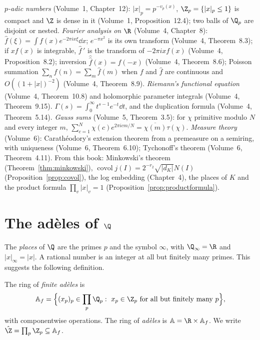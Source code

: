 \begin{reminder}
\emph{$p$-adic numbers} (Volume~1, Chapter~12): $|x|_p=p^{-v_p(x)}$, $\Z_p=\{|x|_p\le1\}$ is compact and $\Z$ is dense in it
(Volume~1, Proposition~12.4); two balls of $\Q_p$ are disjoint or nested. \emph{Fourier analysis on $\R$} (Volume~4, Chapter~8):
$\hat f(\xi)=\int f(x)e^{-2\pi ix\xi}\dd x$; $e^{-\pi x^2}$ is its own transform (Volume~4, Theorem~8.3); if $xf(x)$ is integrable,
$\hat f\,'$ is the transform of $-2\pi ixf(x)$ (Volume~4, Proposition~8.2); inversion $\hat{\hat f}(x)=f(-x)$ (Volume~4, Theorem~8.6);
Poisson summation $\sum_nf(n)=\sum_m\hat f(m)$ when $f$ and $\hat f$ are continuous and $O((1+|x|)^{-2})$ (Volume~4, Theorem~8.9).
\emph{Riemann's functional equation} (Volume~4, Theorem~10.8) and holomorphic parameter integrals (Volume~4, Theorem~9.15).
$\Gamma(s)=\int_0^\infty t^{s-1}e^{-t}\dd t$, and the duplication formula (Volume~4, Theorem~5.14). \emph{Gauss sums} (Volume~5,
Theorem~3.5): for $\chi$ primitive modulo $N$ and every integer $m$, $\sum_{c=1}^N\chi(c)e^{2\pi icm/N}=\overline{\chi(m)}\tau(\chi)$.
\emph{Measure theory} (Volume~6): Carath\'eodory's extension theorem from a premeasure on a semiring, with uniqueness (Volume~6,
Theorem~6.10); Tychonoff's theorem (Volume~6, Theorem~4.11). From this book: Minkowski's theorem (Theorem~\ref{thm:minkowski}),
$\operatorname{covol}j(I)=2^{-r_2}\sqrt{|d_K|}N(I)$ (Proposition~\ref{prop:covol}), the log embedding (Chapter~4), the places of $K$
and the product formula $\prod_v|x|_v=1$ (Proposition~\ref{prop:productformula}).
\end{reminder}

\section{The ad\`eles of \texorpdfstring{$\Q$}{Q}}

The \emph{places} of $\Q$ are the primes $p$ and the symbol $\infty$, with $\Q_\infty=\R$ and $|x|_\infty=|x|$. A rational number is
an integer at all but finitely many primes. This suggests the following definition.

\begin{definition}
The ring of \emph{finite ad\`eles} is
\[
\mathbb{A}_f=\Bigl\{(x_p)_p\in\prod_p\Q_p:\ x_p\in\Z_p\text{ for all but finitely many }p\Bigr\},
\]
with componentwise operations. The ring of \emph{ad\`eles} is $\mathbb{A}=\R\times\mathbb{A}_f$. We write $\hat{\Z}=\prod_p\Z_p\subseteq\mathbb{A}_f$.
\end{definition}

